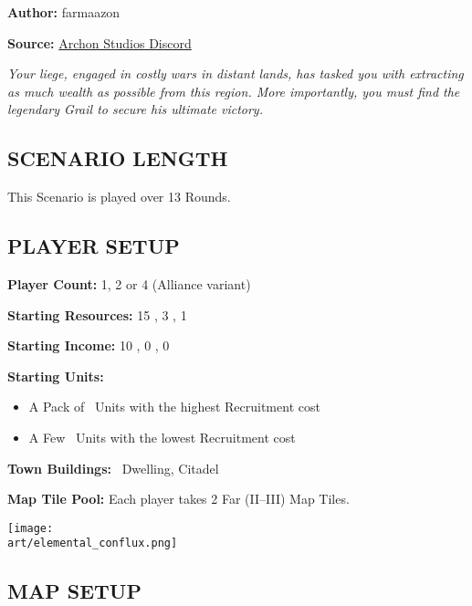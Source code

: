 
\begin{multicols*}{2}

\textbf{Author:} farmaazon

\textbf{Source:} \href{https://discordapp.com/channels/740870068178649108/1344400556717768865/1344400556717768865}{Archon Studios Discord}

\textit{Your liege, engaged in costly wars in distant lands, has tasked you with extracting as much wealth as possible from this region. More importantly, you must find the legendary Grail to secure his ultimate victory.}

\subsection*{\MakeUppercase{Scenario Length}}

This Scenario is played over 13 Rounds.

\subsection*{\MakeUppercase{Player Setup}}

\textbf{Player Count:} 1, 2 or 4 (Alliance variant)

\textbf{Starting Resources:} 15 , 3 , 1 

\textbf{Starting Income:} 10 , 0 , 0 

\textbf{Starting Units:}
\begin{itemize}
  \item A Pack of \bronze\ Units with the highest Recruitment cost
  \item A Few \silver\ Units with the lowest Recruitment cost
\end{itemize}

\textbf{Town Buildings:} \bronze\ Dwelling, Citadel

\textbf{Map Tile Pool:} Each player takes 2 Far (II--III) Map Tiles.

\begin{center}
  {\texttt{[image: \\art/elemental\_conflux.png]}}
\end{center}

\subsection*{\MakeUppercase{Map Setup}}


\end{multicols*}
